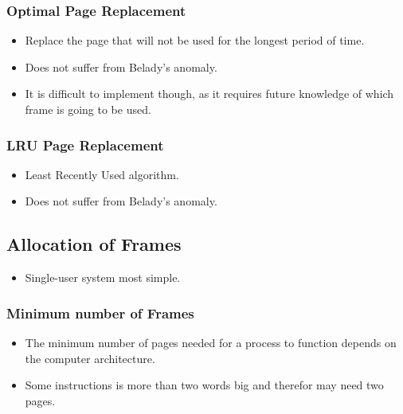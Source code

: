 \documentclass[a4wide,10pt]{article}
\begin{document}
	\subsubsection{Optimal Page Replacement} %
	\label{ssub:optimal_page_replacement}
	\begin{itemize}
		\item Replace the page that will not be used for the longest period of time.
		\item Does not suffer from Belady's anomaly.
		\item It is difficult to implement though, as it requires future knowledge of which frame is going to be used.
	\end{itemize}
	
	\subsubsection{LRU Page Replacement} %
	\label{ssub:lru_page_replacement}
	\begin{itemize}
		\item Least Recently Used algorithm.
		\item Does not suffer from Belady's anomaly.
	\end{itemize}

\subsection{Allocation of Frames} %
\label{sub:allocation_of_frames}
	\begin{itemize}
		\item Single-user system most simple.
	\end{itemize}
	
	\subsubsection{Minimum number of Frames} %
	\label{ssub:minimum_number_of_frames}
	\begin{itemize}
		\item The minimum number of pages needed for a process to function depends on the computer architecture.
		\item Some instructions is more than two words big and therefor may need two pages.
	\end{itemize}
	
\end{document}
